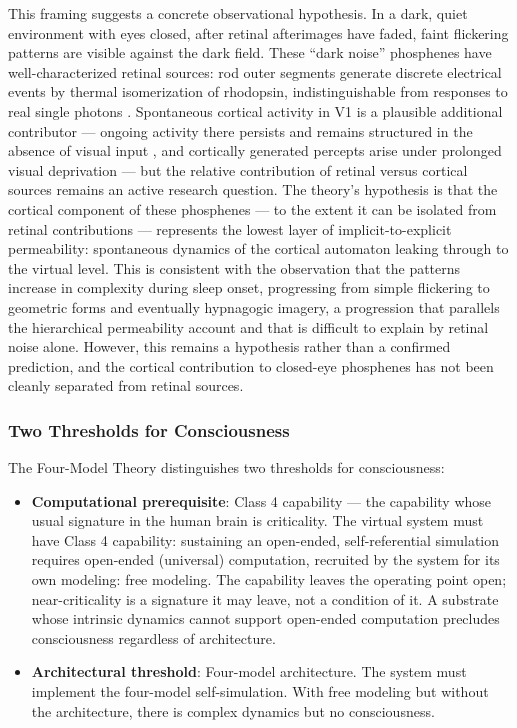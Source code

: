\documentclass[12pt]{article}
\begin{document}
This framing suggests a concrete observational hypothesis. In a dark, quiet environment with eyes closed, after retinal afterimages have faded, faint flickering patterns are visible against the dark field. These ``dark noise'' phosphenes have well-characterized retinal sources: rod outer segments generate discrete electrical events by thermal isomerization of rhodopsin, indistinguishable from responses to real single photons \citep{BaylorLambYau1979,BaylorMatthewsYau1980}. Spontaneous cortical activity in V1 is a plausible additional contributor --- ongoing activity there persists and remains structured in the absence of visual input \citep{Kenet2003}, and cortically generated percepts arise under prolonged visual deprivation \citep{Merabet2004} --- but the relative contribution of retinal versus cortical sources remains an active research question. The theory's hypothesis is that the cortical component of these phosphenes --- to the extent it can be isolated from retinal contributions --- represents the lowest layer of implicit-to-explicit permeability: spontaneous dynamics of the cortical automaton leaking through to the virtual level. This is consistent with the observation that the patterns increase in complexity during sleep onset, progressing from simple flickering to geometric forms and eventually hypnagogic imagery, a progression that parallels the hierarchical permeability account and that is difficult to explain by retinal noise alone. However, this remains a hypothesis rather than a confirmed prediction, and the cortical contribution to closed-eye phosphenes has not been cleanly separated from retinal sources.

\subsubsection{Two Thresholds for Consciousness}

The Four-Model Theory distinguishes two thresholds for consciousness:
\begin{itemize}
\item \textbf{Computational prerequisite}: Class 4 capability --- the capability whose usual signature in the human brain is criticality. The virtual system must have Class 4 capability: sustaining an open-ended, self-referential simulation requires open-ended (universal) computation, recruited by the system for its own modeling: free modeling. The capability leaves the operating point open; near-criticality is a signature it may leave, not a condition of it. A substrate whose intrinsic dynamics cannot support open-ended computation precludes consciousness regardless of architecture.
\item \textbf{Architectural threshold}: Four-model architecture. The system must implement the four-model self-simulation. With free modeling but without the architecture, there is complex dynamics but no consciousness.
\end{itemize}
\end{document}
